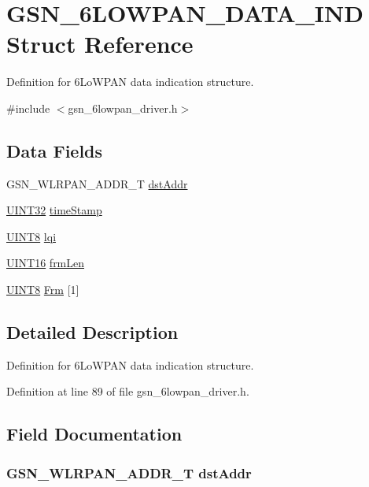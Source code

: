 \hypertarget{a00020}{
\section{GSN\_\-6LOWPAN\_\-DATA\_\-IND Struct Reference}
\label{a00020}
}


Definition for 6LoWPAN data indication structure.  




{\ttfamily \#include $<$gsn\_\-6lowpan\_\-driver.h$>$}

\subsection*{Data Fields}
\begin{DoxyCompactItemize}
\item 
GSN\_\-WLRPAN\_\-ADDR\_\-T \hyperlink{a00020_a24eb07f9718fa28350cec1c3ef586821}{dstAddr}
\item 
\hyperlink{a00660_gae1e6edbbc26d6fbc71a90190d0266018}{UINT32} \hyperlink{a00020_ae7eca8d649117ff5c69fbfcfa178898f}{timeStamp}
\item 
\hyperlink{a00660_gab27e9918b538ce9d8ca692479b375b6a}{UINT8} \hyperlink{a00020_a33bfa8f8be6d77e0996567f8b46ce2f7}{lqi}
\item 
\hyperlink{a00660_ga09f1a1fb2293e33483cc8d44aefb1eb1}{UINT16} \hyperlink{a00020_a8c39fe07938dd92f46a8d5b149780e81}{frmLen}
\item 
\hyperlink{a00660_gab27e9918b538ce9d8ca692479b375b6a}{UINT8} \hyperlink{a00020_a89d3003ccf727f39dc3b93bbe711c857}{Frm} \mbox{[}1\mbox{]}
\end{DoxyCompactItemize}


\subsection{Detailed Description}
Definition for 6LoWPAN data indication structure. 

Definition at line 89 of file gsn\_\-6lowpan\_\-driver.h.



\subsection{Field Documentation}
\hypertarget{a00020_a24eb07f9718fa28350cec1c3ef586821}{
\subsubsection[{dstAddr}]{\setlength{\rightskip}{0pt plus 5cm}GSN\_\-WLRPAN\_\-ADDR\_\-T {\bf dstAddr}}}
\label{a00020_a24eb07f9718fa28350cec1c3ef586821}


